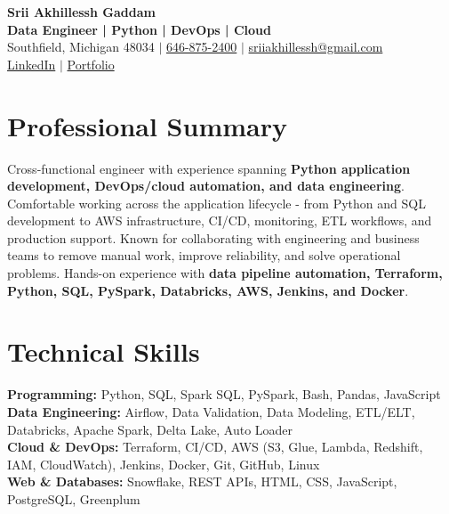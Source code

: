 \documentclass[letterpaper,10pt]{article}
\begin{document}
\fontsize{9.35pt}{10.45pt}\selectfont

\begin{center}
    {\LARGE \textbf{Srii Akhillessh Gaddam}} \\[-1pt]
    \textbf{Data Engineer | Python | DevOps | Cloud} \\[2pt]
    Southfield, Michigan 48034 $|$
    \href{tel:6468752400}{646-875-2400} $|$
    \href{mailto:sriiakhillessh@gmail.com}{sriiakhillessh@gmail.com} \\[1pt]
    \href{https://www.linkedin.com/in/srii-akhiilessh-gaddam-b48668191/}{LinkedIn} $|$
    \href{https://sriiakhillesshg.github.io/portfolio/}{Portfolio}
\end{center}
\vspace{-8pt}

\section{Professional Summary}
\small{Cross-functional engineer with experience spanning \textbf{Python application development, DevOps/cloud automation, and data engineering}. Comfortable working across the application lifecycle - from Python and SQL development to AWS infrastructure, CI/CD, monitoring, ETL workflows, and production support. Known for collaborating with engineering and business teams to remove manual work, improve reliability, and solve operational problems. Hands-on experience with \textbf{data pipeline automation, Terraform, Python, SQL, PySpark, Databricks, AWS, Jenkins, and Docker}.}

\section{Technical Skills}
\small{
\textbf{Programming:} Python, SQL, Spark SQL, PySpark, Bash, Pandas, JavaScript \\
\textbf{Data Engineering:} Airflow, Data Validation, Data Modeling, ETL/ELT, Databricks, Apache Spark, Delta Lake, Auto Loader \\
\textbf{Cloud \& DevOps:} Terraform, CI/CD, AWS (S3, Glue, Lambda, Redshift, IAM, CloudWatch), Jenkins, Docker, Git, GitHub, Linux \\
\textbf{Web \& Databases:} Snowflake, REST APIs, HTML, CSS, JavaScript, PostgreSQL, Greenplum
}

\end{document}
